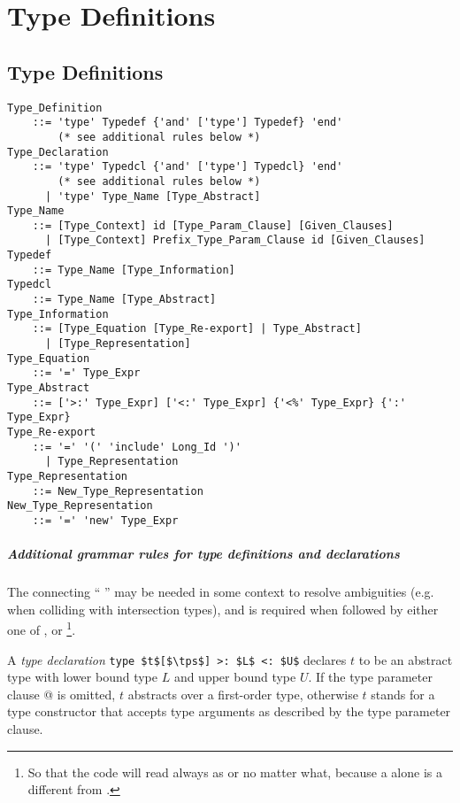 
\chapter{Type Definitions}

\minitoc

\newpage

\section{Type Definitions}
\label{sec:type-decls-aliases}

\grammar\begin{lstlisting}
Type_Definition 
    ::= 'type' Typedef {'and' ['type'] Typedef} 'end'
        (* see additional rules below *)
Type_Declaration
    ::= 'type' Typedcl {'and' ['type'] Typedcl} 'end'
        (* see additional rules below *)
      | 'type' Type_Name [Type_Abstract]
Type_Name
    ::= [Type_Context] id [Type_Param_Clause] [Given_Clauses]
      | [Type_Context] Prefix_Type_Param_Clause id [Given_Clauses]
Typedef 
    ::= Type_Name [Type_Information]
Typedcl
    ::= Type_Name [Type_Abstract]
Type_Information
    ::= [Type_Equation [Type_Re-export] | Type_Abstract]
      | [Type_Representation]
Type_Equation 
    ::= '=' Type_Expr
Type_Abstract 
    ::= ['>:' Type_Expr] ['<:' Type_Expr] {'<%' Type_Expr} {':' Type_Expr}
Type_Re-export
    ::= '=' '(' 'include' Long_Id ')'
      | Type_Representation
Type_Representation
    ::= New_Type_Representation
New_Type_Representation
    ::= '=' 'new' Type_Expr
\end{lstlisting}

\paragraph{Additional grammar rules for type definitions and declarations}
The connecting ``\,\code{['type']}\,'' may be needed in some context to resolve ambiguities (e.g. when colliding with intersection types), and is required when followed by either one of ,  or \footnote{So that the code will read always as  or  no matter what, because a  alone is a different from .}. 

A {\em type declaration} \lstinline!type $t$[$\tps$] >: $L$ <: $U$! declares $t$ to be an abstract type with lower bound type $L$ and upper bound type $U$. If the type parameter clause \lstinline@[$\tps$]@ is omitted, $t$ abstracts over a first-order type, otherwise $t$ stands for a type constructor that accepts type arguments as described by the type parameter clause. 

